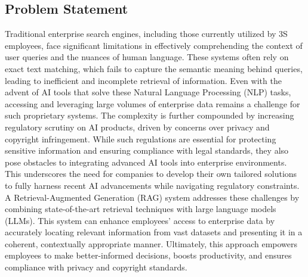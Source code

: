 \subsection{Problem Statement}
Traditional enterprise search engines, including those currently utilized by 3S employees, face significant limitations in effectively comprehending the context of user queries and the nuances of human language. These systems often rely on exact text matching, which fails to capture the semantic meaning behind queries, leading to inefficient and incomplete retrieval of information.\medskip\newline
Even with the advent of AI tools that solve these Natural Language Processing (NLP) tasks, accessing and leveraging large volumes of enterprise data remains a challenge for such proprietary systems. The complexity is further compounded by increasing regulatory scrutiny on AI products, driven by concerns over privacy and copyright infringement.\smallskip\newline
While such regulations are essential for protecting sensitive information and ensuring compliance with legal standards, they also pose obstacles to integrating advanced AI tools into enterprise environments. This underscores the need for companies to develop their own tailored solutions to fully harness recent AI advancements while navigating regulatory constraints.\bigskip\newline
A Retrieval-Augmented Generation (RAG) system addresses these challenges by combining state-of-the-art retrieval techniques with large language models (LLMs). This system can enhance employees' access to enterprise data by accurately locating relevant information from vast datasets and presenting it in a coherent, contextually appropriate manner. Ultimately, this approach empowers employees to make better-informed decisions, boosts productivity, and ensures compliance with privacy and copyright standards.
